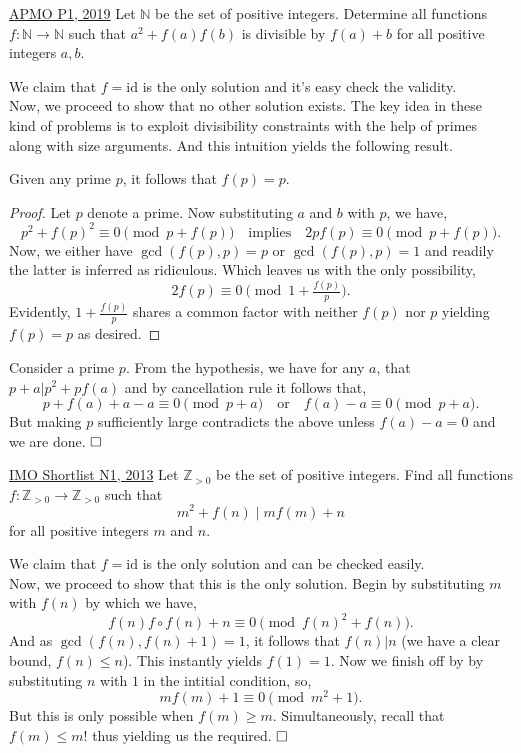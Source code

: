 \begin{problem}{2}{\href{https://artofproblemsolving.com/community/c6h1854148p12519631}{APMO P1, 2019}}
	Let $\mathbb{N}$ be the set of positive integers. Determine all functions $f:\mathbb{N}\to\mathbb{N}$ such that $a^2+f(a)f(b)$ is divisible by $f(a)+b$ for all positive integers $a,b$.
	\begin{solution} We claim that $f=\text{id}$ is the only solution and it's easy check the validity.\\
		\indent Now, we proceed to show that no other solution exists. The key idea in these kind of problems is to exploit divisibility constraints with the help of primes along with size arguments. And this intuition yields the following result.
		
		\begin{claim}
			Given any prime $p$, it follows that $f(p)=p$.
		\end{claim}
		\begin{proof}
			Let $p$ denote a prime. Now substituting $a$ and $b$ with $p$, we have,
			\[p^2+f(p)^2\equiv 0\pmod{p+f(p)}\quad\text{implies}\quad 2pf(p)\equiv 0\pmod{p+f(p)} .\]
			Now, we either have $\gcd(f(p), p)=p$ or $\gcd(f(p), p)=1$ and readily the latter is inferred as ridiculous. Which leaves us with the only possibility,
			\[2f(p)\equiv 0\pmod{1+\tfrac{f(p)}{p}}.\]
			Evidently, $1+\tfrac{f(p)}{p}$ shares a common factor with neither $f(p)$ nor $p$ yielding $f(p)=p$ as desired.
		\end{proof}
		
		\indent Consider a prime $p$. From the hypothesis, we have for any $a$, that $p+a\lvert p^2+pf(a)$ and by cancellation rule it follows that,
		\[p+f(a)+a-a\equiv 0\pmod {p+a}\quad\text{or}\quad f(a)-a\equiv 0\pmod{p+a}.\]
		But making $p$ sufficiently large contradicts the above unless $f(a)-a=0$ and we are done. $\qedwhite$
	\end{solution}
\end{problem}

\begin{problem}{3}{\href{https://artofproblemsolving.com/community/c6h597243p3544096}{IMO Shortlist N1, 2013}}
	Let $\mathbb{Z} _{>0}$ be the set of positive integers. Find all functions $f: \mathbb{Z} _{>0}\rightarrow \mathbb{Z} _{>0}$ such that
\[ m^2 + f(n) \mid mf(m) +n \]
for all positive integers $m$ and $n$.
	\begin{solution}
		We claim that $f=\mathrm{id}$ is the only solution and can be checked easily.\\
		Now, we proceed to show that this is the only solution. Begin by substituting $m$ with $f(n)$ by which we have,
		\[f(n)f\circ f(n)+n\equiv 0\pmod {f(n)^2+f(n)}.\]
		\indent And as $\gcd(f(n), f(n)+1)=1$, it follows that $f(n)\lvert n$ (we have a clear bound, $f(n)\le n$). This instantly yields $f(1)=1$. Now we finish off by by substituting $n$ with $1$ in the intitial condition, so,
		\[mf(m)+1 \equiv 0\pmod{m^2+1}.\]
		But this is only possible when $f(m)\ge m$. Simultaneously, recall that $f(m)\le m$! thus yielding us the required. $\qedwhite$
	\end{solution}
\end{problem}
	

	

